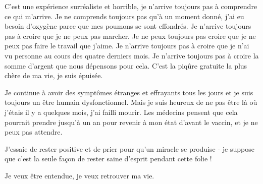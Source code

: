 C'est une expérience surréaliste et horrible, je n'arrive toujours pas à
comprendre ce qui m'arrive. Je ne comprends toujours pas qu'à un moment donné,
j'ai eu besoin d'oxygène parce que mes poumons se sont effondrés. Je n'arrive
toujours pas à croire que je ne peux pas marcher. Je ne peux toujours pas croire
que je ne peux pas faire le travail que j'aime. Je n'arrive toujours pas à
croire que je n'ai vu personne au cours des quatre derniers mois. Je n'arrive
toujours pas à croire la somme d'argent que nous dépensons pour cela. C'est la
piqûre gratuite la plus chère de ma vie, je suis épuisée.

Je continue à avoir des symptômes étranges et effrayants tous les jours et je
suis toujours un être humain dysfonctionnel. Mais je suis heureux de ne pas être
là où j'étais il y a quelques mois, j'ai failli mourir. Les médecins pensent que
cela pourrait prendre jusqu'à un an pour revenir à mon état d'avant le vaccin,
et je ne peux pas attendre.

J'essaie de rester positive et de prier pour qu'un miracle se produise - je
suppose que c'est la seule façon de rester saine d'esprit pendant cette folie !

Je veux être entendue, je veux retrouver ma vie.

